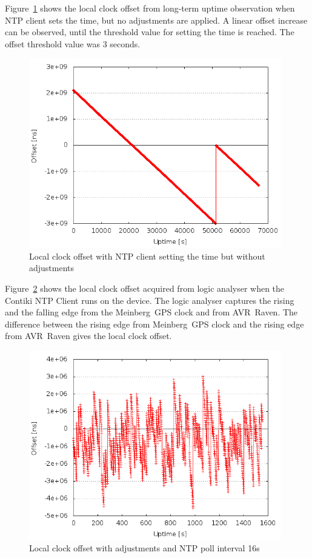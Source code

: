 Figure~\ref{fig:app-ntp-set-time} shows the local clock offset from long-term uptime
observation when NTP client sets the time, but no adjustments are applied.
A linear offset increase can be observed, until the threshold value
for setting the time is reached.
The offset threshold value was 3 seconds.
\begin{figure}[H]
  \centering
  \includegraphics[width=11cm,keepaspectratio]{fig/set-time-3s.png}
  \caption{Local clock offset with NTP client setting the time but without adjustments}
  \label{fig:app-ntp-set-time}
\end{figure}

Figure~\ref{fig:app-ntp-la} shows the local clock offset
acquired from logic analyser when the Contiki NTP Client runs on the device.
The logic analyser captures the rising and the falling edge
from the Meinberg~GPS clock and from AVR~Raven.
The difference between the rising edge from
Meinberg~GPS clock and the rising edge from AVR~Raven gives the local clock offset.
\begin{figure}[H]
  \centering
  \includegraphics[width=11cm,keepaspectratio]{fig/la.png}
  \caption{Local clock offset with adjustments and NTP poll interval 16s}
  \label{fig:app-ntp-la}
\end{figure}


